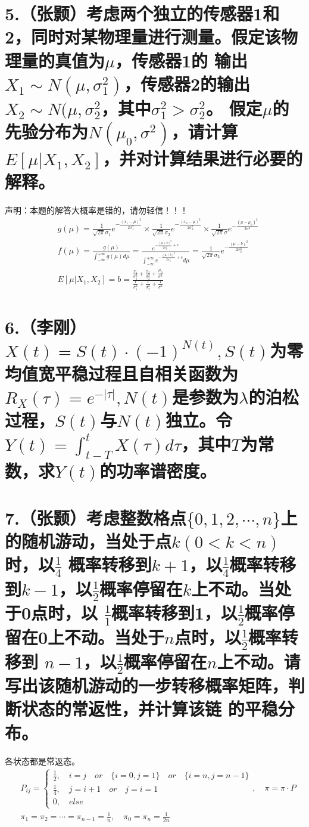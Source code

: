 \documentclass[UTF8]{ctexart}
\begin{document}
\section*{5.（张颢）考虑两个独立的传感器1和2，同时对某物理量进行测量。假定该物理量的真值为$\mu$，传感器1的
  输出$X_1\sim N(\mu,\sigma_1^2)$，传感器2的输出$X_2\sim N(\mu,\sigma_2^2$，其中$\sigma_1^2>\sigma_2^2$。
  假定$\mu$的先验分布为$N(\mu_0,\sigma^2)$，请计算$E[\mu\lvert X_1,X_2]$，并对计算结果进行必要的解释。}
 {\color{red} 声明：本题的解答大概率是错的，请勿轻信！！！}
\begin{equation*}
  \begin{aligned}
     & g(\mu)=\frac{1}{\sqrt{2\pi}\sigma_1}e^{-\frac{(x_1-\mu)^2}{2\sigma_1^2}}\times
    \frac{1}{\sqrt{2\pi}\sigma_2}e^{-\frac{(x_2-\mu)^2}{2\sigma_2^2}}\times
    \frac{1}{\sqrt{2\pi}\sigma}e^{-\frac{(\mu-\mu_0)^2}{2\sigma^2}}                   \\
     & f(\mu)=\frac{g(\mu)}{\int_{-\infty}^{+\infty}g(\mu)d\mu}
    =\frac{e^{-\frac{(\mu+b)^2}{2\sigma_3^2}+c}}
    {\int_{-\infty}^{+\infty}e^{-\frac{(\mu+b)^2}{2\sigma_3^2}+c}d\mu}
    =\frac{1}{\sqrt{2\pi}\sigma_3}e^{-\frac{(\mu-b)^2}{2\sigma_3^2}}                  \\
     & E[\mu\lvert X_1,X_2]=b=\frac{\frac{x_1}{\sigma_1^2}+\frac{x_2}{\sigma_2^2}+
      \frac{\mu_0}{\sigma^2}}{\frac{1}{\sigma_1^2}+\frac{1}{\sigma_2^2}+\frac{1}{\sigma^2}}
  \end{aligned}
\end{equation*}
\section*{6.（李刚）$X(t)=S(t)\cdot(-1)^{N(t)},S(t)$为零均值宽平稳过程且自相关函数为$R_X(\tau)=e^{-
  \lvert\tau\rvert},N(t)$是参数为$\lambda$的泊松过程，$S(t)$与$N(t)$独立。令$Y(t)=\int_{t-T}^t X(\tau)
  d\tau$，其中$T$为常数，求$Y(t)$的功率谱密度。}
\section*{7.（张颢）考虑整数格点$\{0,1,2,\cdots,n\}$上的随机游动，当处于点$k(0<k<n)$时，以$\frac{1}{4}$
  概率转移到$k+1$，以$\frac{1}{4}$概率转移到$k-1$，以$\frac{1}{2}$概率停留在$k$上不动。当处于0点时，以
  $\frac{1}{1}$概率转移到1，以$\frac{1}{2}$概率停留在0上不动。当处于$n$点时，以$\frac{1}{2}$概率转移到
  $n-1$，以$\frac{1}{2}$概率停留在$n$上不动。请写出该随机游动的一步转移概率矩阵，判断状态的常返性，并计算该链
  的平稳分布。}
各状态都是常返态。
\begin{equation*}
  \begin{aligned}
     & P_{ij}=\begin{cases}
      \frac{1}{2},\quad i=j\quad or\quad\{i=0,j=1\}\quad or\quad\{i=n,j=n-1\} \\
      \frac{1}{4},\quad j=i+1\quad or \quad j=i=1                             \\
      0,\quad else
    \end{cases},\quad\pi=\pi\cdot P                   \\
     & \pi_1=\pi_2=\cdots=\pi_{n-1}=\frac{1}{n},\quad\pi_0=\pi_n=\frac{1}{2n} \\
  \end{aligned}
\end{equation*}
\end{document}

